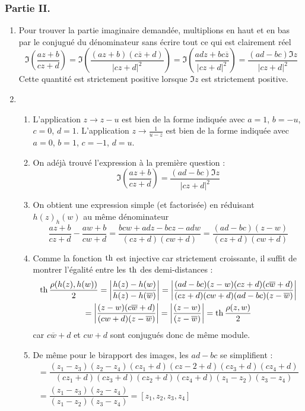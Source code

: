 \subsubsection*{Partie II.}
\begin{enumerate}
 \item Pour trouver la partie imaginaire demandée, multiplions en haut et en bas par le conjugué du dénominateur sans écrire tout ce qui est clairement réel
\begin{displaymath}
 \Im\left( \dfrac{az+b}{cz+d}\right)  = \Im \left( \dfrac{(az+b)(c\overline{z}+d)}{|cz+d|^2}\right) 
= \Im \left( \dfrac{adz + bc\overline{z}}{|cz+d|^2}\right) 
= \dfrac{(ad-bc)\Im z}{|cz+d|^2}
\end{displaymath}
Cette quantité est strictement positive lorsque $\Im z$ est strictement positive.
\item \begin{enumerate}
 \item L'application $z\rightarrow z-u$ est bien de la forme indiquée avec $a=1$, $b=-u$, $c=0$, $d=1$.\newline
L'application $z\rightarrow\frac{1}{u-z}$ est bien de la forme indiquée avec $a=0$, $b=1$, $c=-1$, $d=u$.
\item On adéjà trouvé l'expression à la première question :
\begin{displaymath}
 \Im\left( \dfrac{az+b}{cz+d}\right)  = \dfrac{(ad-bc)\Im z}{|cz+d|^2}
\end{displaymath}

\item On obtient une expression simple (et factorisée) en réduisant $h(z)_h(w)$ au même dénominateur
\begin{displaymath}
 \dfrac{az+b}{cz+d}-\dfrac{aw+b}{cw+d}
=\dfrac{bcw+adz-bcz-adw}{(cz+d)(cw+d)}
=\dfrac{(ad-bc)(z-w)}{(cz+d)(cw+d)}
\end{displaymath}

\item Comme la fonction $\operatorname{th}$ est injective car strictement croissante, il suffit de montrer l'égalité entre les $\operatorname{th}$ des demi-distances :
\begin{multline*}
 \operatorname{th}\dfrac{\rho(h(z),h(w))}{2}= \left\vert \dfrac{h(z)-h(w)}{h(z)-h(\overline{w})}\right\vert
= \left\vert \dfrac{(ad-bc)(z-w)(cz+d)(c\overline{w}+d)}{(cz+d)(cw+d)(ad-bc)(z-\overline{w})}\right\vert \\
= \left\vert \dfrac{(z-w)(c\overline{w}+d)}{(cw+d)(z-\overline{w})}\right\vert
= \left\vert \dfrac{(z-w)}{(z-\overline{w})}\right\vert
=\operatorname{th}\dfrac{\rho(z,w)}{2}
\end{multline*}
car $c\overline{w}+d$ et $cw+d$ sont conjugués donc de même module.
\item De même pour le birapport des images, les $ad-bc$ se simplifient :
\begin{align*}
 [h(z_1),h(z_2),h(z_3),h(z_4)] = 
\dfrac{(z_1-z_3)(z_2-z_4)(cz_1+d)(cz-2+d)(cz_3+d)(cz_4+d)}{(cz_1+d)(cz_3+d)(cz_2+d)(cz_4+d)(z_1-z_2)(z_3-z_4)}\\
= \dfrac{(z_1-z_3)(z_2-z_4)}{(z_1-z_2)(z_3-z_4)}=[z_1,z_2,z_3,z_4]
\end{align*}
\end{enumerate}
\end{enumerate}


